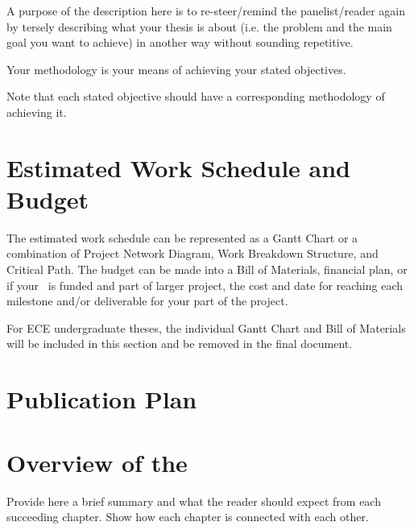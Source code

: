 A purpose of the description here is to re-steer/remind the panelist/reader again by tersely describing what your thesis is about (i.e. the problem and the main goal you want to achieve) in another way without sounding repetitive.

Your methodology is your means of achieving your stated objectives.

Note that each stated objective should have a corresponding methodology of achieving it.

\graytx{\blindtext}


\ifFinished
\else

\section{Estimated Work Schedule and Budget}

The estimated work schedule can be represented as a Gantt Chart or a combination of Project Network Diagram, Work Breakdown Structure, and Critical Path.  The budget can be made into a Bill of Materials, financial plan, or if your \documentType \ is funded and part of larger project, the cost and date for reaching each milestone and/or deliverable for your part of the project.

For ECE undergraduate theses, the individual Gantt Chart and Bill of Materials will be included in this section and be removed in the final document.

\graytx{\blindtext}

\ifPhD
\section{Publication Plan}
\graytx{\blindtext}
\fi

\fi


\section{Overview of the \documentType}

Provide here a brief summary and what the reader should expect from each succeeding chapter.  Show how each chapter is connected with each other.
